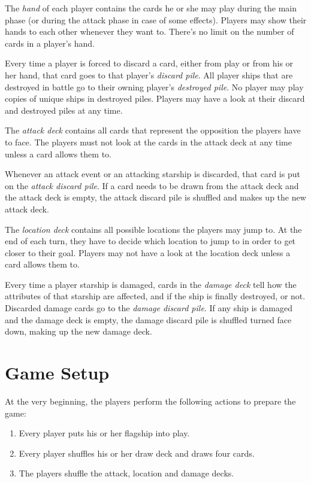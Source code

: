 \documentclass[11pt, a4paper]{article}
\begin{document}
The \emph{hand} of each player contains the cards he or she may play during the
main phase (or during the attack phase in case of some effects). Players may
show their hands to each other whenever they want to. There's no limit on the
number of cards in a player's hand.

Every time a player is forced to discard a card, either from play or from his or
her hand, that card goes to that player's \emph{discard pile}. All player ships
that are destroyed in battle go to their owning player's \emph{destroyed pile}.
No player may play copies of unique ships in destroyed piles. Players may have a
look at their discard and destroyed piles at any time.

The \emph{attack deck} contains all cards that represent the opposition the
players have to face. The players must not look at the cards in the attack deck
at any time unless a card allows them to.

Whenever an attack event or an attacking starship is discarded, that card is put
on the \emph{attack discard pile}. If a card needs to be drawn from the attack
deck and the attack deck is empty, the attack discard pile is shuffled and makes
up the new attack deck.

The \emph{location deck} contains all possible locations the players may jump
to. At the end of each turn, they have to decide which location to jump to in
order to get closer to their goal. Players may not have a look at the location
deck unless a card allows them to.

Every time a player starship is damaged, cards in the \emph{damage deck} tell
how the attributes of that starship are affected, and if the ship is finally
destroyed, or not. Discarded damage cards go to the \emph{damage discard pile}.
If any ship is damaged and the damage deck is empty, the damage discard pile
is shuffled turned face down, making up the new damage deck.

\section{Game Setup}

At the very beginning, the players perform the following actions to prepare the
game:

\begin{enumerate}
  \item Every player puts his or her flagship into play.
  \item Every player shuffles his or her draw deck and draws four cards.
  \item The players shuffle the attack, location and damage decks.
\end{enumerate}
\end{document}
